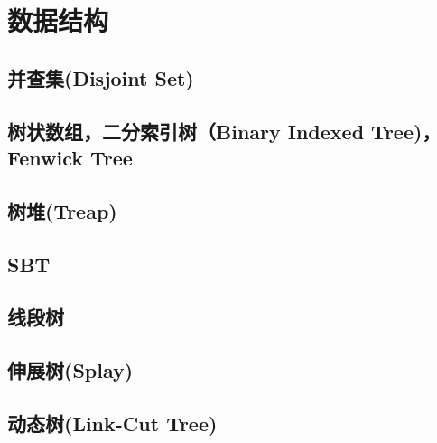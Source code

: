 \section{数据结构}
\subsection{并查集(Disjoint Set)}
\subsection{树状数组，二分索引树（Binary Indexed Tree)，Fenwick Tree}
\subsection{树堆(Treap)}
\subsection{SBT}
\subsection{线段树}
\subsection{伸展树(Splay)}
\subsection{动态树(Link-Cut Tree)}
